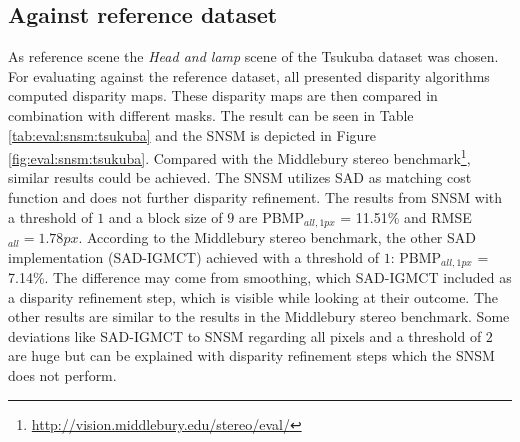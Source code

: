 \subsection{Against reference dataset}

As reference scene the \textit{Head and lamp} scene of the Tsukuba dataset was chosen.
For evaluating against the reference dataset, all presented disparity algorithms computed disparity maps.
These disparity maps are then compared in combination with different masks.
The result can be seen in Table \ref{tab:eval:snsm:tsukuba} and the SNSM is depicted in Figure \ref{fig:eval:snsm:tsukuba}.
Compared with the Middlebury stereo benchmark\footnote{\url{http://vision.middlebury.edu/stereo/eval/}}, similar results could be achieved.
\newline\newline\noindent The SNSM utilizes SAD as matching cost function and does not further disparity refinement.
The results from SNSM with a threshold of $1$ and a block size of $9$ are PBMP$_{all,1px}$ = 11.51\% and RMSE$_{all} = 1.78px$.
According to the Middlebury stereo benchmark, the other SAD implementation (SAD-IGMCT) \citep{ambrosch2010accurate} achieved with a threshold of $1$: PBMP$_{all,1px}$ = 7.14\%.
The difference may come from smoothing, which SAD-IGMCT included as a disparity refinement step, which is visible while looking at their outcome.
The other results are similar to the results in the Middlebury stereo benchmark.
Some deviations like SAD-IGMCT to SNSM regarding all pixels and a threshold of $2$ are huge but can be explained with disparity refinement steps which the SNSM does not perform.

